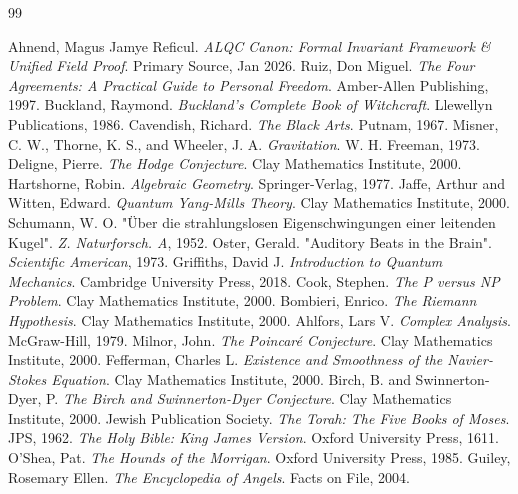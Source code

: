 \documentclass[11pt, letterpaper]{article}
\begin{document}
\begin{thebibliography}{99}

 Ahnend, Magus Jamye Reficul. \textit{ALQC Canon: Formal Invariant Framework \& Unified Field Proof}. Primary Source, Jan 2026.
 Ruiz, Don Miguel. \textit{The Four Agreements: A Practical Guide to Personal Freedom}. Amber-Allen Publishing, 1997.
 Buckland, Raymond. \textit{Buckland's Complete Book of Witchcraft}. Llewellyn Publications, 1986.
 Cavendish, Richard. \textit{The Black Arts}. Putnam, 1967.
 Misner, C. W., Thorne, K. S., and Wheeler, J. A. \textit{Gravitation}. W. H. Freeman, 1973.
 Deligne, Pierre. \textit{The Hodge Conjecture}. Clay Mathematics Institute, 2000.
 Hartshorne, Robin. \textit{Algebraic Geometry}. Springer-Verlag, 1977.
 Jaffe, Arthur and Witten, Edward. \textit{Quantum Yang-Mills Theory}. Clay Mathematics Institute, 2000.
 Schumann, W. O. "Über die strahlungslosen Eigenschwingungen einer leitenden Kugel". \textit{Z. Naturforsch. A}, 1952.
 Oster, Gerald. "Auditory Beats in the Brain". \textit{Scientific American}, 1973.
 Griffiths, David J. \textit{Introduction to Quantum Mechanics}. Cambridge University Press, 2018.
 Cook, Stephen. \textit{The P versus NP Problem}. Clay Mathematics Institute, 2000.
 Bombieri, Enrico. \textit{The Riemann Hypothesis}. Clay Mathematics Institute, 2000.
 Ahlfors, Lars V. \textit{Complex Analysis}. McGraw-Hill, 1979.
 Milnor, John. \textit{The Poincaré Conjecture}. Clay Mathematics Institute, 2000.
 Fefferman, Charles L. \textit{Existence and Smoothness of the Navier-Stokes Equation}. Clay Mathematics Institute, 2000.
 Birch, B. and Swinnerton-Dyer, P. \textit{The Birch and Swinnerton-Dyer Conjecture}. Clay Mathematics Institute, 2000.
 Jewish Publication Society. \textit{The Torah: The Five Books of Moses}. JPS, 1962.
 \textit{The Holy Bible: King James Version}. Oxford University Press, 1611.
 O'Shea, Pat. \textit{The Hounds of the Morrigan}. Oxford University Press, 1985.
 Guiley, Rosemary Ellen. \textit{The Encyclopedia of Angels}. Facts on File, 2004.

\end{thebibliography}
\end{document}
